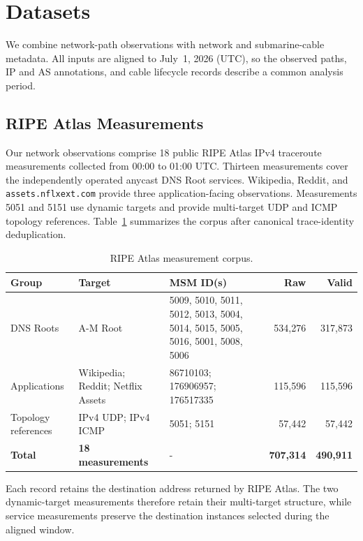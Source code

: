 \section{Datasets}
\label{sec:datasets}

We combine network-path observations with network and submarine-cable
metadata. All inputs are aligned to July~1, 2026 (UTC), so the observed paths,
IP and AS annotations, and cable lifecycle records describe a common analysis
period.

\subsection{RIPE Atlas Measurements}
\label{subsec:atlas_corpus}

Our network observations comprise 18 public RIPE Atlas IPv4 traceroute
measurements collected from 00:00 to 01:00 UTC. Thirteen measurements cover the
independently operated anycast DNS Root services. Wikipedia, Reddit, and
\texttt{assets.nflxext.com} provide three application-facing observations.
Measurements 5051 and 5151 use dynamic targets and provide multi-target UDP and
ICMP topology references. Table~\ref{tab:atlas_measurements} summarizes the
corpus after canonical trace-identity deduplication.

\begin{table}[ht]
  \centering
  \caption{RIPE Atlas measurement corpus.}
  \label{tab:atlas_measurements}
  \footnotesize
  \setlength{\tabcolsep}{4.2pt}
  \begin{tabular}{p{}p{}p{}rr}
    \toprule
    Group & Target & MSM ID(s) & Raw & Valid \\
    \midrule
    DNS Roots & A-M Root
      & 5009, 5010, 5011, 5012, 5013, 5004, 5014, 5015, 5005, 5016,
        5001, 5008, 5006
      & 534,276 & 317,873 \\
    Applications & Wikipedia; Reddit; Netflix Assets
      & 86710103; 176906957; 176517335
      & 115,596 & 115,596 \\
    Topology references & IPv4 UDP; IPv4 ICMP
      & 5051; 5151
      & 57,442 & 57,442 \\
    \midrule
    \textbf{Total} & \textbf{18 measurements} & -
      & \textbf{707,314} & \textbf{490,911} \\
    \bottomrule
  \end{tabular}
\end{table}

Each record retains the destination address returned by RIPE Atlas. The two
dynamic-target measurements therefore retain their multi-target structure,
while service measurements preserve the destination instances selected during
the aligned window.

